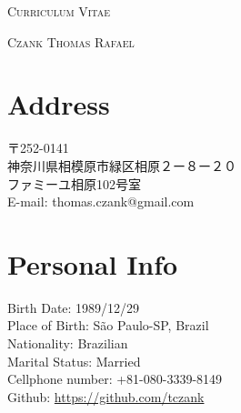 \documentclass[a4paper]{article}
\begin{document}
\pagestyle{empty}

\begin{center}
\huge{\textsc{Curriculum Vitae}}
\vspace{\baselineskip}

\Large{\textsc{Czank Thomas Rafael}}
\end{center}
\vspace{1.5\baselineskip}

\section{Address}
\begin{CJK}{UTF8}{ipxm}
  \begin{flushleft}
〒252-0141 　\\
神奈川県相模原市緑区相原２ー８ー２０ \\
ファミーユ相原102号室 \\
E-mail: thomas.czank@gmail.com\\
\end{flushleft}
\end{CJK}

\section{Personal Info}
\begin{minipage}{0.5\textwidth}
\begin{flushleft}
  Birth Date: 1989/12/29  \\
  Place of Birth: São Paulo-SP, Brazil \\
  Nationality: Brazilian \\
  Marital Status: Married\\
  Cellphone number: +81-080-3339-8149\\
  Github: \url{https://github.com/tczank}
\end{flushleft}
\end{minipage}
\hfill

\end{document}

